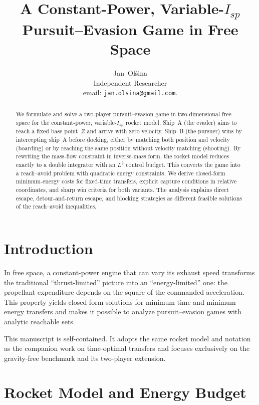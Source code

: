 \documentclass[journal, a4paper]{IEEEtran}
\begin{document}
\title{A Constant-Power, Variable-$I_{\!sp}$ Pursuit--Evasion Game in Free Space}

\author{Jan~Ol\v{s}ina\\[1ex] Independent Researcher\\
email: \texttt{jan.olsina@gmail.com}.}

\maketitle

\begin{abstract}
We formulate and solve a two-player pursuit--evasion game in two-dimensional free space for the constant-power, variable-$I_{\!sp}$ rocket model. Ship~A (the evader) aims to reach a fixed base point~$Z$ and arrive with zero velocity. Ship~B (the pursuer) wins by intercepting ship~A before docking, either by matching both position and velocity (boarding) or by reaching the same position without velocity matching (shooting). By rewriting the mass-flow constraint in inverse-mass form, the rocket model reduces exactly to a double integrator with an $L^2$ control budget. This converts the game into a reach--avoid problem with quadratic energy constraints. We derive closed-form minimum-energy costs for fixed-time transfers, explicit capture conditions in relative coordinates, and sharp win criteria for both variants. The analysis explains direct escape, detour-and-return escape, and blocking strategies as different feasible solutions of the reach--avoid inequalities.
\end{abstract}

\section{Introduction}
In free space, a constant-power engine that can vary its exhaust speed transforms the traditional ``thrust-limited'' picture into an ``energy-limited'' one: the propellant expenditure depends on the square of the commanded acceleration.
This property yields closed-form solutions for minimum-time and minimum-energy transfers and makes it possible to analyze pursuit--evasion games with analytic reachable sets.

This manuscript is self-contained. It adopts the same rocket model and notation as the companion work on time-optimal transfers and focuses exclusively on the gravity-free benchmark and its two-player extension.

\section{Rocket Model and Energy Budget}
\label{sec:model}
\end{document}
